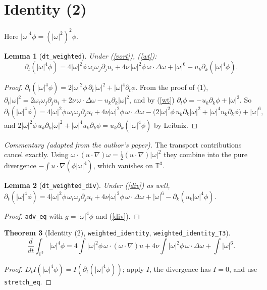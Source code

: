 \documentclass[11pt]{article}
\newtheorem{theorem}{Theorem}\newtheorem{lemma}[theorem]{Lemma}\theoremstyle{definition}\newtheorem{definition}[theorem]{Definition}
\begin{document}
\section{Identity (2)}
Here $|\omega|^4\phi=(|\omega|^2)^2\phi$.
\begin{lemma}[\texttt{dt\_weighted}]
Under (\ref{vort}), (\ref{wt}):
\[\partial_t(|\omega|^4\phi)=4|\omega|^2\phi\,\omega_i\omega_j\partial_ju_i+4\nu\,|\omega|^2\phi\,\omega\cdot\Delta\omega+|\omega|^6-u_k\partial_k(|\omega|^4\phi).\]
\end{lemma}
\begin{proof}
$\partial_t(|\omega|^4\phi)=2|\omega|^2\phi\,\partial_t|\omega|^2+|\omega|^4\partial_t\phi$. From the proof of (1),
$\partial_t|\omega|^2=2\omega_i\omega_j\partial_ju_i+2\nu\,\omega\cdot\Delta\omega-u_k\partial_k|\omega|^2$, and by (\ref{wt})
$\partial_t\phi=-u_k\partial_k\phi+|\omega|^2$. So
\[\partial_t(|\omega|^4\phi)=4|\omega|^2\phi\,\omega_i\omega_j\partial_ju_i+4\nu|\omega|^2\phi\,\omega\cdot\Delta\omega
-\big(2|\omega|^2\phi\,u_k\partial_k|\omega|^2+|\omega|^4u_k\partial_k\phi\big)+|\omega|^6,\]
and $2|\omega|^2\phi\,u_k\partial_k|\omega|^2+|\omega|^4u_k\partial_k\phi=u_k\partial_k(|\omega|^4\phi)$ by Leibniz.
\end{proof}
\emph{Commentary (adapted from the author's paper).} The transport contributions cancel exactly.
Using $\omega\cdot(u\cdot\nabla)\omega=\frac12(u\cdot\nabla)|\omega|^2$ they combine into the pure
divergence $-\int u\cdot\nabla(\phi|\omega|^4)$, which vanishes on $\mathbb{T}^3$.
\begin{lemma}[\texttt{dt\_weighted\_div}]
Under (\ref{div}) as well,
$\partial_t(|\omega|^4\phi)=4|\omega|^2\phi\,\omega_i\omega_j\partial_ju_i+4\nu|\omega|^2\phi\,\omega\cdot\Delta\omega+|\omega|^6-\partial_k(u_k|\omega|^4\phi)$.
\end{lemma}
\begin{proof}\texttt{adv\_eq} with $g=|\omega|^4\phi$ and (\ref{div}).\end{proof}
\begin{theorem}[Identity (2), \texttt{weighted\_identity}, \texttt{weighted\_identity\_T3}]
\[\frac{d}{dt}\int_{\mathbb{T}^3}|\omega|^4\phi=4\int|\omega|^2\phi\,\omega\cdot(\omega\cdot\nabla)u+4\nu\int|\omega|^2\phi\,\omega\cdot\Delta\omega+\int|\omega|^6 .\]
\end{theorem}
\begin{proof}$D_tI(|\omega|^4\phi)=I(\partial_t(|\omega|^4\phi))$; apply $I$, the divergence has $I=0$, and use
\texttt{stretch\_eq}.\end{proof}
\end{document}
